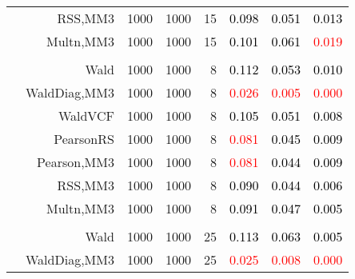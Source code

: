 \documentclass[
]{article}
\begin{document}
\begin{table}[H]
{\begin{tabular}[t]{lrrrrrrr}
\hspace{1em} & RSS,MM3 & 1000 & 1000 & 15 & \textcolor{black}{0.098} & \textcolor{black}{0.051} & \textcolor{black}{0.013}\\

\hspace{1em} & Multn,MM3 & 1000 & 1000 & 15 & \textcolor{black}{0.101} & \textcolor{black}{0.061} & \textcolor{red}{0.019}\\
\cmidrule{1-8}
\addlinespace[0.3em]
\multicolumn{8}{l}{\textbf{2F 10V}}\\
\hspace{1em} & Wald & 1000 & 1000 & 8 & \textcolor{black}{0.112} & \textcolor{black}{0.053} & \textcolor{black}{0.010}\\

\hspace{1em} & WaldDiag,MM3 & 1000 & 1000 & 8 & \textcolor{red}{0.026} & \textcolor{red}{0.005} & \textcolor{red}{0.000}\\

\hspace{1em} & WaldVCF & 1000 & 1000 & 8 & \textcolor{black}{0.105} & \textcolor{black}{0.051} & \textcolor{black}{0.008}\\

\hspace{1em} & PearsonRS & 1000 & 1000 & 8 & \textcolor{red}{0.081} & \textcolor{black}{0.045} & \textcolor{black}{0.009}\\

\hspace{1em} & Pearson,MM3 & 1000 & 1000 & 8 & \textcolor{red}{0.081} & \textcolor{black}{0.044} & \textcolor{black}{0.009}\\

\hspace{1em} & RSS,MM3 & 1000 & 1000 & 8 & \textcolor{black}{0.090} & \textcolor{black}{0.044} & \textcolor{black}{0.006}\\

\hspace{1em} & Multn,MM3 & 1000 & 1000 & 8 & \textcolor{black}{0.091} & \textcolor{black}{0.047} & \textcolor{black}{0.005}\\
\cmidrule{1-8}
\addlinespace[0.3em]
\multicolumn{8}{l}{\textbf{3F 15V}}\\
\hspace{1em} & Wald & 1000 & 1000 & 25 & \textcolor{black}{0.113} & \textcolor{black}{0.063} & \textcolor{black}{0.005}\\

\hspace{1em} & WaldDiag,MM3 & 1000 & 1000 & 25 & \textcolor{red}{0.025} & \textcolor{red}{0.008} & \textcolor{red}{0.000}\\


\end{tabular}}
\end{table}
\end{document}

